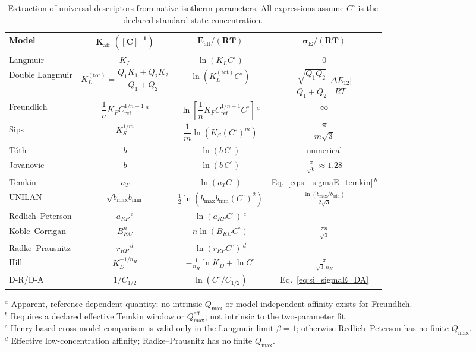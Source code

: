 \documentclass[journal=jacsat,manuscript=article]{achemso}
\begin{document}
\begin{table}[H]
	\centering
	\small
	\caption{Extraction of universal descriptors from native isotherm
		parameters.  All expressions assume $C^\circ$ is the declared
		standard-state concentration.}
	\label{tab:si_extraction}
	\renewcommand{\arraystretch}{1.5}
	\begin{tabular}{@{} l c c c @{}}
		\toprule
		\textbf{Model}
		& $\boldsymbol{K_{\mathrm{aff}}}$ $\boldsymbol{([C]^{-1})}$
		& $\boldsymbol{E_{\mathrm{aff}}/(RT)}$
		& $\boldsymbol{\sigma_E/(RT)}$ \\
		\midrule
		Langmuir
		& $K_L$
		& $\ln(K_L C^\circ)$
		& $0$ \\
		Double Langmuir
		& $K_L^{\mathrm{(tot)}} = \dfrac{Q_1K_1 + Q_2K_2}{Q_1+Q_2}$
		& $\ln(K_L^{\mathrm{(tot)}} C^\circ)$
		& $\dfrac{\sqrt{Q_1Q_2}}{Q_1+Q_2}\dfrac{|\Delta E_{12}|}{RT}$ \\
		Freundlich
		& $\dfrac{1}{n}K_F C_{\mathrm{ref}}^{1/n-1}$\,$^{a}$
		& $\ln\!\left[\dfrac{1}{n}K_F C_{\mathrm{ref}}^{1/n-1} C^\circ\right]$\,$^{a}$
		& $\infty$ \\
		Sips
		& $K_S^{1/m}$
		& $\dfrac{1}{m}\ln(K_S (C^\circ)^m)$
		& $\dfrac{\pi}{m\sqrt{3}}$ \\
		T\'{o}th
		& $b$
		& $\ln(b\,C^\circ)$
		& numerical \\
		Jovanovic
		& $b$
		& $\ln(b\,C^\circ)$
		& $\frac{\pi}{\sqrt{6}} \approx 1.28$ \\
		Temkin
		& $a_T$
		& $\ln(a_T C^\circ)$
		& Eq.~\ref{eq:si_sigmaE_temkin}\,$^{b}$ \\
		UNILAN
		& $\sqrt{b_{\max}b_{\min}}$
		& $\frac{1}{2}\ln(b_{\max}b_{\min}(C^\circ)^2)$
		& $\frac{\ln(b_{\max}/b_{\min})}{2\sqrt{3}}$ \\
		Redlich--Peterson
		& $a_{RP}$\,$^{c}$
		& $\ln(a_{RP} C^\circ)$\,$^{c}$
		& --- \\
		Koble--Corrigan
		& $B_{KC}^{n}$
		& $n\ln(B_{KC} C^\circ)$
		& $\frac{\pi n}{\sqrt{3}}$ \\
		Radke--Prausnitz
		& $r_{RP}$\,$^{d}$
		& $\ln(r_{RP} C^\circ)$\,$^{d}$
		& --- \\
		Hill
		& $K_D^{-1/n_H}$
		& $-\frac{1}{n_H}\ln K_D + \ln C^\circ$
		& $\frac{\pi}{\sqrt{3}\,n_H}$ \\
		D-R/D-A
		& $1/C_{1/2}$
		& $\ln(C^\circ/C_{1/2})$
		& Eq.~\ref{eq:si_sigmaE_DA} \\
		\bottomrule
	\end{tabular}

	\smallskip

	\noindent $^{a}$ Apparent, reference-dependent quantity; no intrinsic
	$Q_{\max}$ or model-independent affinity exists for Freundlich.\\
	\noindent $^{b}$ Requires a declared effective Temkin window or
	$Q_{\max}^{\mathrm{eff}}$; not intrinsic to the two-parameter fit.\\
	\noindent $^{c}$ Henry-based cross-model comparison is valid only in the
	Langmuir limit $\beta = 1$; otherwise Redlich--Peterson has no finite
	$Q_{\max}$.\\
	\noindent $^{d}$ Effective low-concentration affinity; Radke--Prausnitz has
	no finite $Q_{\max}$.
\end{table}
\end{document}
